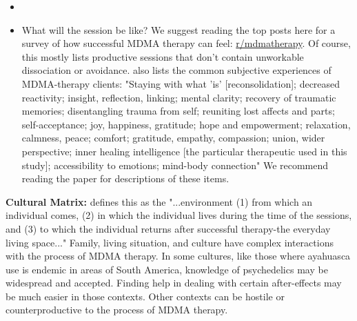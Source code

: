 \documentclass[12pt,letterpaper]{article}
\begin{document}
\begin{itemize}
    \item {}
    \item What will the session be like? We suggest reading the top posts here for a survey of how successful MDMA therapy can feel: \href{https://old.reddit.com/r/mdmatherapy/top/?sort=top&t=all}{r/mdmatherapy}. Of course, this mostly lists productive sessions that don't contain unworkable dissociation or avoidance. \textcite{godes2023perceived} also lists the common subjective experiences of MDMA-therapy clients: "Staying with what 'is' [reconsolidation]; decreased reactivity; insight, reflection, linking; mental clarity; recovery of traumatic memories; disentangling trauma from self; reuniting lost affects and parts; self-acceptance; joy, happiness, gratitude; hope and empowerment; relaxation, calmness, peace; comfort; gratitude, empathy, compassion; union, wider perspective; inner healing intelligence [the particular therapeutic used in this study]; accessibility to emotions; mind-body connection" We recommend reading the paper for descriptions of these items.
\end{itemize}
\noindent \textbf{Cultural Matrix:} \textcite{setSettingMatrix} defines this as the "...environment (1) from which an individual comes, (2) in which the individual lives during the time of the sessions, and (3) to which the individual returns after successful therapy-the everyday living space..." Family, living situation, and culture have complex interactions with the process of MDMA therapy. In some cultures, like those where ayahuasca use is endemic in areas of South America, knowledge of psychedelics may be widespread and accepted. Finding help in dealing with certain after-effects may be much easier in those contexts. Other contexts can be hostile or counterproductive to the process of MDMA therapy. 

\vspace{\baselineskip}
\end{document}
